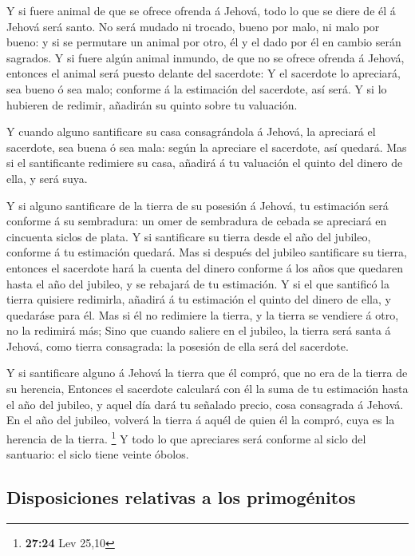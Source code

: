  Y si fuere animal de que se ofrece ofrenda á Jehová, todo
lo que se diere de él á Jehová será santo.  No será
mudado ni trocado, bueno por malo, ni malo por bueno: y si se permutare
un animal por otro, él y el dado por él en cambio serán sagrados.
 Y si fuere algún animal inmundo, de que no se ofrece
ofrenda á Jehová, entonces el animal será puesto delante del sacerdote:
 Y el sacerdote lo apreciará, sea bueno ó sea malo;
conforme á la estimación del sacerdote, así será.  Y si
lo hubieren de redimir, añadirán su quinto sobre tu valuación.

 Y cuando alguno santificare su casa consagrándola á
Jehová, la apreciará el sacerdote, sea buena ó sea mala: según la
apreciare el sacerdote, así quedará.  Mas si el
santificante redimiere su casa, añadirá á tu valuación el quinto del
dinero de ella, y será suya.

 Y si alguno santificare de la tierra de su posesión á
Jehová, tu estimación será conforme á su sembradura: un omer de
sembradura de cebada se apreciará en cincuenta siclos de plata.
 Y si santificare su tierra desde el año del jubileo,
conforme á tu estimación quedará.  Mas si después del
jubileo santificare su tierra, entonces el sacerdote hará la cuenta del
dinero conforme á los años que quedaren hasta el año del jubileo, y se
rebajará de tu estimación.  Y si el que santificó la
tierra quisiere redimirla, añadirá á tu estimación el quinto del dinero
de ella, y quedaráse para él.  Mas si él no redimiere la
tierra, y la tierra se vendiere á otro, no la redimirá más;
 Sino que cuando saliere en el jubileo, la tierra será
santa á Jehová, como tierra consagrada: la posesión de ella será del
sacerdote.

 Y si santificare alguno á Jehová la tierra que él
compró, que no era de la tierra de su herencia,  Entonces
el sacerdote calculará con él la suma de tu estimación hasta el año del
jubileo, y aquel día dará tu señalado precio, cosa consagrada á Jehová.
 En el año del jubileo, volverá la tierra á aquél de
quien él la compró, cuya es la herencia de la tierra. \footnote{\textbf{27:24}
  Lev 25,10}  Y todo lo que apreciares será conforme al
siclo del santuario: el siclo tiene veinte óbolos.

\hypertarget{disposiciones-relativas-a-los-primoguxe9nitos}{%
\subsection{Disposiciones relativas a los
primogénitos}\label{disposiciones-relativas-a-los-primoguxe9nitos}}

